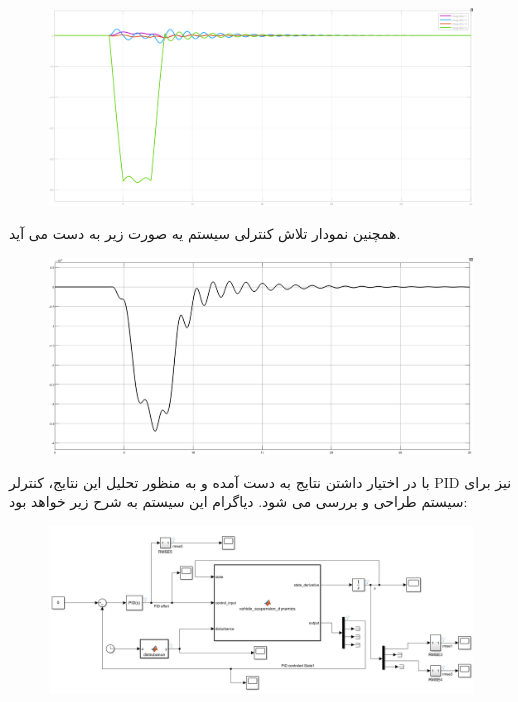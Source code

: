 \begin{figure}[H]
	\centering
	\includegraphics[width=1\linewidth]{../img/6}
	\caption{}
	\label{fig:6}
\end{figure}
همچنین نمودار تلاش کنترلی سیستم یه صورت زیر به دست می آید.

\begin{figure}[H]
	\centering
	\includegraphics[width=1\linewidth]{../img/7}
	\caption{}
	\label{fig:7}
\end{figure}

با در اختیار داشتن نتایج به دست آمده و به منظور تحلیل این نتایج، کنترلر PID نیز برای سیستم طراحی و بررسی می شود. دیاگرام این سیستم به شرح زیر خواهد بود:

\begin{figure}[H]
	\centering
	\includegraphics[width=1\linewidth]{../img/8}
	\caption{}
	\label{fig:8}
\end{figure}

